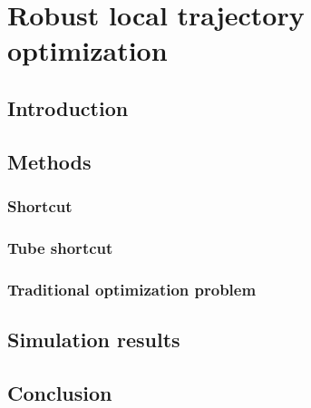 \chapter{Robust local trajectory optimization}

\section{Introduction}

\section{Methods}
\subsection{Shortcut}
\subsection{Tube shortcut}
\subsection{Traditional optimization problem}

\section{Simulation results}

\section{Conclusion}

\todomarker{}